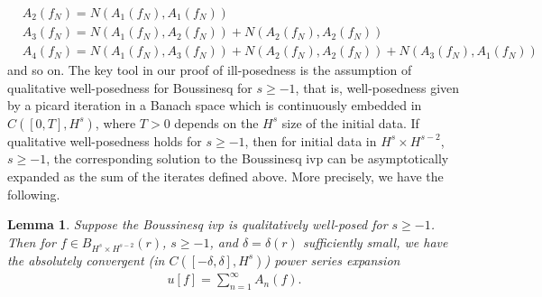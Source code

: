 \documentclass[12pt,reqno]{amsart}
\numberwithin{equation}{section}  %
\newtheorem{lemma}[theorem]{Lemma}
\begin{document}
%
%
\begin{equation*}
\begin{split}
  & A_{2}(f_{N}) = N(A_{1}(f_{N}), A_{1}(f_{N}))
  \\
  & A_{3}(f_{N}) = N(A_{1}(f_{N}), A_{2}(f_{N})) + N(A_{2}(f_{N}), A_{2}(f_{N}))
  \\
  & A_{4}(f_{N})= N(A_{1}(f_{N}), A_{3}(f_{N})) + N(A_{2}(f_{N}), A_{2}(f_{N}))
  + N(A_{3}(f_{N}), A_{1}(f_{N}))
\end{split}
\end{equation*}
%
%
and so on. The key tool in our proof of ill-posedness is the assumption of
qualitative well-posedness for Boussinesq for $s \ge -1$, that is, well-posedness given by a picard iteration in a Banach space which is continuously embedded in $C([0, T], H^{s})$, where $T > 0$ depends on the $H^{s}$ size of the initial data. If qualitative well-posedness holds for $s \ge -1$, then for
initial data in $H^{s} \times H^{s-2}$, $s \ge -1$, the corresponding solution
to the Boussinesq ivp can be asymptotically expanded as the sum of the iterates defined
above. More precisely, we have the following.
\begin{lemma}
  \label{lem:qwp-awp}
  Suppose the Boussinesq ivp is qualitatively well-posed for $s \ge -1$. Then for
  $f \in B_{H^{s} \times H^{s-2}}(r)$, $s \ge -1$,  and $\delta=\delta(r)$
sufficiently small, we have the absolutely convergent
(in $C([-\delta, \delta], H^{s})$) power series expansion
%
%
\begin{equation}
  \label{power-series-soln}
\begin{split}
  u[f] = \sum_{n=1}^{\infty} A_{n}(f).
\end{split}
\end{equation}
%
%
\label{lem:analytic-wp}
\end{lemma}
%
%
%
%
%
%
%
%
%
%
\end{document}
